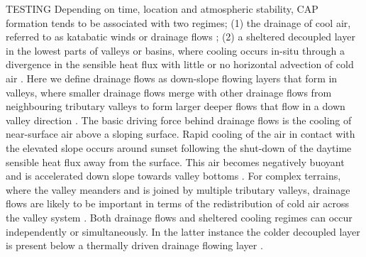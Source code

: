 \documentclass[times]{qjrms4}
\begin{document}
TESTING
Depending on time, location and atmospheric stability, CAP formation tends to be associated with two regimes; (1) the drainage of cool air, referred to as katabatic winds \citep{heywood1933katabatic,manins1979katabatic} or drainage flows \citep{gudiksen1992measurements}; (2) a sheltered decoupled layer in the lowest parts of valleys or basins, where cooling occurs in-situ through a divergence in the sensible heat flux with little or no horizontal advection of cold air \citep{vosper2008numerical}. Here we define drainage flows as down-slope flowing layers that form in valleys, where smaller drainage flows merge with other drainage flows from neighbouring tributary valleys to form larger deeper flows that flow in a down valley direction \citep{orgill1992mesoscale,Vosper2013narrow}. The basic driving force behind drainage flows is the cooling of near-surface air above a sloping surface. Rapid cooling of the air in contact with the elevated slope occurs around sunset following the shut-down of the daytime sensible heat flux away from the surface. This air becomes negatively buoyant and is accelerated down slope towards valley bottoms \citep{vosper2008numerical,gudiksen1992measurements,Vosper2013narrow}. For complex terrains, where the valley meanders and is joined by multiple tributary valleys, drainage flows are likely to be important in terms of the redistribution of cold air across the valley system \citep{vosper2008numerical}. Both drainage flows and sheltered cooling regimes can occur independently or simultaneously. In the latter instance the colder decoupled layer is present below a thermally driven drainage flowing layer \citep{clements2003cold,Vosper2013narrow}.
\end{document}
